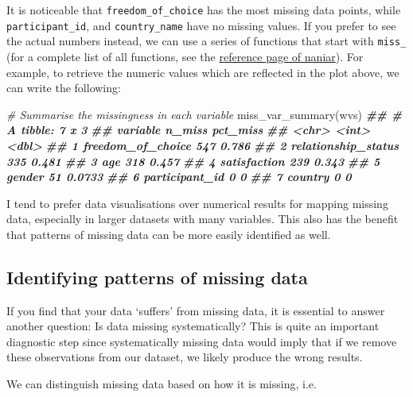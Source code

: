 \documentclass[
]{book}
\newenvironment{Shaded}{\begin{snugshade}}{\end{snugshade}}
\newcommand{\CommentTok}[1]{\textcolor[rgb]{0.56,0.35,0.01}{\textit{#1}}}
\newcommand{\DocumentationTok}[1]{\textcolor[rgb]{0.56,0.35,0.01}{\textbf{\textit{#1}}}}
\newcommand{\FunctionTok}[1]{\textcolor[rgb]{0.00,0.00,0.00}{#1}}
\newcommand{\NormalTok}[1]{#1}
\begin{document}
It is noticeable that \texttt{freedom\_of\_choice} has the most missing data points, while \texttt{participant\_id}, and \texttt{country\_name} have no missing values. If you prefer to see the actual numbers instead, we can use a series of functions that start with \texttt{miss\_} (for a complete list of all functions, see the \href{https://naniar.njtierney.com/reference/index.html}{reference page of naniar}). For example, to retrieve the numeric values which are reflected in the plot above, we can write the following:

\begin{Shaded}
\begin{Highlighting}[]
\CommentTok{\# Summarise the missingness in each variable}
\FunctionTok{miss\_var\_summary}\NormalTok{(wvs)}
\DocumentationTok{\#\# \# A tibble: 7 x 3}
\DocumentationTok{\#\#   variable            n\_miss pct\_miss}
\DocumentationTok{\#\#   \textless{}chr\textgreater{}                \textless{}int\textgreater{}    \textless{}dbl\textgreater{}}
\DocumentationTok{\#\# 1 freedom\_of\_choice      547   0.786 }
\DocumentationTok{\#\# 2 relationship\_status    335   0.481 }
\DocumentationTok{\#\# 3 age                    318   0.457 }
\DocumentationTok{\#\# 4 satisfaction           239   0.343 }
\DocumentationTok{\#\# 5 gender                  51   0.0733}
\DocumentationTok{\#\# 6 participant\_id           0   0     }
\DocumentationTok{\#\# 7 country                  0   0}
\end{Highlighting}
\end{Shaded}

I tend to prefer data visualisations over numerical results for mapping missing data, especially in larger datasets with many variables. This also has the benefit that patterns of missing data can be more easily identified as well.

\hypertarget{patterns-of-missing-data}{%
\subsection{Identifying patterns of missing data}\label{patterns-of-missing-data}}

If you find that your data `suffers' from missing data, it is essential to answer another question: Is data missing systematically? This is quite an important diagnostic step since systematically missing data would imply that if we remove these observations from our dataset, we likely produce the wrong results.

We can distinguish missing data based on how it is missing, i.e.
\end{document}
